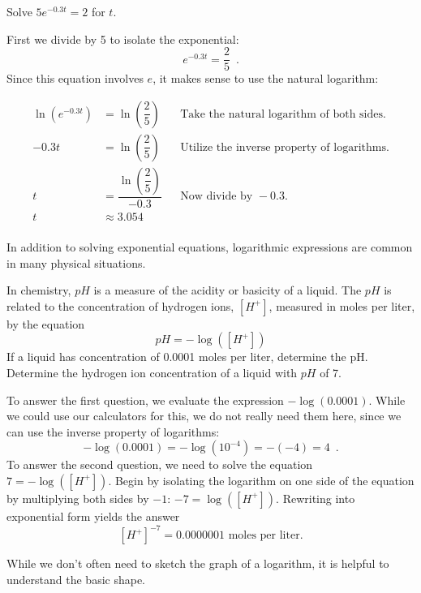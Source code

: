 \begin{example}
Solve $5e^{-0.3t}=2$ for $t$.

\begin{solution}  First we divide by 5 to isolate the exponential:
$$e^{-0.3t}=\frac{2}{5} \enspace .$$
Since this equation involves $e$, it makes sense to use the natural logarithm:

\begin{align*}
    \ln\left(e^{-0.3t}\right) &= \ln\left(\dfrac{2}{5}\right)& &\mbox{Take the natural logarithm of both sides.}\\
    -0.3t &= \ln\left(\dfrac{2}{5}\right)& &\mbox{Utilize the inverse property of logarithms.}\\
    t &= \dfrac{\ln\left(\dfrac{2}{5}\right)}{-0.3}&  &\mbox{Now divide by } -0.3.\\
    t &\approx 3.054& &\\
\end{align*}
\end{solution}\end{example}

In addition to solving exponential equations, logarithmic expressions are common in many physical situations.

\begin{example}
In chemistry, $pH$ is a measure of the acidity or basicity of a liquid. The $pH$ is related to the concentration of hydrogen ions, $[H^+]$, measured in moles per liter, by the equation
$$pH=-\log([H^+])$$
If a liquid has concentration of 0.0001 moles per liter, determine the pH. Determine the hydrogen ion concentration of a liquid with $pH$ of 7.

\begin{solution}  To answer the first question, we evaluate the expression $-\log(0.0001)$. While we could use our calculators for this, we do not really need them here, since we can use the inverse property of logarithms:
$$-\log(0.0001)=-\log(10^{-4})=-(-4)=4 \enspace .$$
To answer the second question, we need to solve the equation $7=-\log([H^+])$. Begin by isolating the logarithm on one side of the equation by multiplying both sides by $-1$: $-7=\log([H^+])$. Rewriting into exponential form yields the answer
$$[H^+]^{-7}=0.0000001 \mbox{ moles per liter.}$$
\end{solution}\end{example}

While we don't often need to sketch the graph of a logarithm, it is helpful to understand the basic shape.

